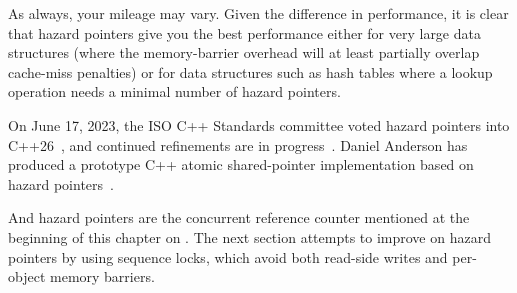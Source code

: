 {{	As always, your mileage may vary.
	Given the difference in performance, it is clear that hazard
	pointers give you the best performance either for
	very large data structures (where the memory-barrier overhead
	will at least partially overlap cache-miss penalties) or
	for data structures such as hash tables where a lookup
	operation needs a minimal number of hazard pointers.
}\QuickQuizEndM
%
\QuickQuizEndE
}

On June 17, 2023, the ISO C++ Standards committee voted hazard pointers
into C++26~\cite{MagedMichael2023C++26Hazptr3}, and continued refinements
are in
progress~\cite{MagedMichael2025C++29hazptrSyncRec,MagedMichael2025C++29hazptrBatches}.
Daniel Anderson has produced a prototype C++ atomic shared-pointer
implementation based on hazard
pointers~\cite{DanielAnderson2023HazptrSharedPtr}.

And hazard pointers are the concurrent reference counter mentioned at
the beginning of this chapter on
.
The next section attempts to improve on hazard pointers by using
sequence locks, which avoid both read-side writes and per-object memory
barriers.
